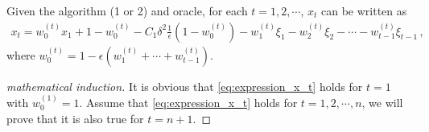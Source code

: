 \documentclass[11pt,letterpaper,english]{article}
\begin{document}
\begin{proposition}
Given the algorithm (1 or 2) and oracle, for each $t=1,2,\cdots$, $x_t$ can be written as
\begin{align}
\label{eq:expression_x_t}
x_{t} = w^{(t)}_0 x_1 + 1-w^{(t)}_0 -C_1 \delta^2 \frac{1}{\epsilon}(1-w^{(t)}_0) -w^{(t)}_1 \xi_1 - w^{(t)}_2 \xi_2 - \cdots - w^{(t)}_{t-1} \xi_{t-1} \,,
\end{align}
where $w^{(t)}_0 = 1-\epsilon (w^{(t)}_1+\cdots+w^{(t)}_{t-1})$.
\end{proposition}
\begin{proof}[mathematical induction]
It is obvious that \ref{eq:expression_x_t} holds for $t=1$ with $w^{(1)}_0=1$.
Assume that \ref{eq:expression_x_t} holds for $t=1,2,\cdots,n$, we will prove that it is also true for $t=n+1$.


\end{proof}
\end{document}
